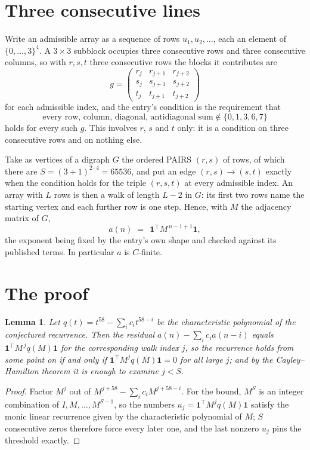 \documentclass[11pt,a4paper]{article}
\theoremstyle{plain}
\newtheorem{lemma}[theorem]{Lemma}
\theoremstyle{definition}
\begin{document}
\section{Three consecutive lines}

Write an admissible array as a sequence of rows $u_1,u_2,\dots$, each an element of
$\{0,\dots,3\}^{4}$. A $3\times3$ subblock occupies three consecutive rows and
three consecutive columns, so with $r,s,t$ three consecutive rows the blocks it
contributes are
\[
g=\begin{pmatrix}r_j&r_{j+1}&r_{j+2}\\ s_j&s_{j+1}&s_{j+2}\\ t_j&t_{j+1}&t_{j+2}\end{pmatrix}
\]
for each admissible index, and the entry's condition is the requirement that
\[
\text{every row, column, diagonal, antidiagonal sum} \notin \{0,1,3,6,7\}
\]
holds for every such $g$. This involves $r$, $s$ and $t$ only: it is a condition on
three consecutive rows and on nothing else.

Take as vertices of a digraph $G$ the ordered PAIRS $(r,s)$ of rows, of which there are
$S=(3+1)^{2\cdot4}=65536$, and put an edge $(r,s)\to(s,t)$ exactly when the condition
holds for the triple $(r,s,t)$ at every admissible index. An array with $L$ rows is then a
walk of length $L-2$ in $G$: its first two rows name the starting vertex and each further
row is one step. Hence, with $M$ the adjacency matrix of $G$,
\[
a(n)\;=\;\,\mathbf{1}^{\!\top}M^{\,n-1+1}\mathbf{1},
\]
the exponent being fixed by the entry's own shape and checked against its published terms.
In particular $a$ is $C$-finite.

\section{The proof}

\begin{lemma}\label{lem:crit}
Let $q(t)=t^{58}-\sum_i c_it^{58-i}$ be the characteristic polynomial of the
conjectured recurrence. Then the residual $a(n)-\sum_ic_ia(n-i)$ equals
$\mathbf{1}^{\!\top}M^{\,j}q(M)\mathbf{1}$ for the corresponding walk index
$j$, so the recurrence holds from some point on if and only if
$\mathbf{1}^{\!\top}M^{j}q(M)\mathbf{1}=0$ for all large $j$; and by the
Cayley--Hamilton theorem it is enough to examine $j<S$.
\end{lemma}

\begin{proof}
Factor $M^{j}$ out of $M^{j+58}-\sum_ic_iM^{j+58-i}$. For the bound, $M^{S}$
is an integer combination of $I,M,\dots,M^{S-1}$, so the numbers
$u_j=\mathbf{1}^{\!\top}M^{j}q(M)\mathbf{1}$ satisfy the monic linear recurrence given by
the characteristic polynomial of $M$; $S$ consecutive zeros therefore force every later one,
and the last nonzero $u_j$ pins the threshold exactly.
\end{proof}
\end{document}
